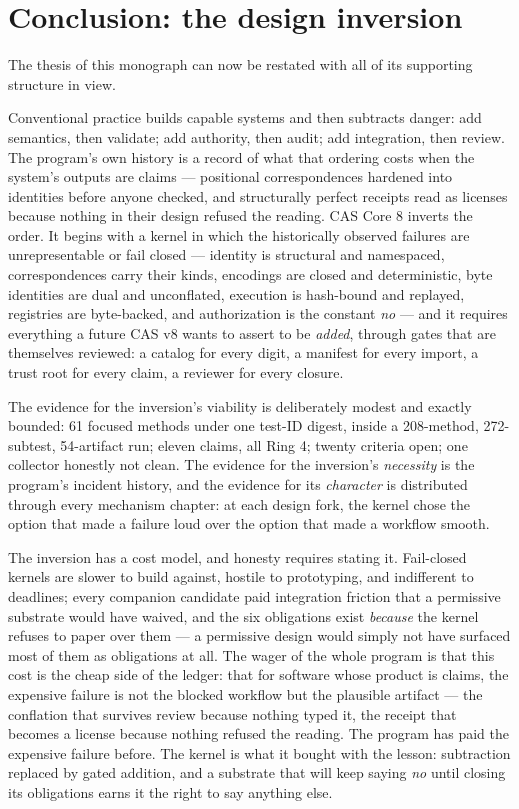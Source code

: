 \section{Conclusion: the design inversion}\label{evid:conclusion}

The thesis of this monograph can now be restated with all of its supporting structure in view.

Conventional practice builds capable systems and then subtracts danger: add semantics, then validate; add authority, then audit; add integration, then review. The program's own history is a record of what that ordering costs when the system's outputs are claims --- positional correspondences hardened into identities before anyone checked, and structurally perfect receipts read as licenses because nothing in their design refused the reading. CAS Core 8 inverts the order. It begins with a kernel in which the historically observed failures are unrepresentable or fail closed --- identity is structural and namespaced, correspondences carry their kinds, encodings are closed and deterministic, byte identities are dual and unconflated, execution is hash-bound and replayed, registries are byte-backed, and authorization is the constant \emph{no} --- and it requires everything a future CAS v8 wants to assert to be \emph{added}, through gates that are themselves reviewed: a catalog for every digit, a manifest for every import, a trust root for every claim, a reviewer for every closure.

The evidence for the inversion's viability is deliberately modest and exactly bounded: 61 focused methods under one test-ID digest, inside a 208-method, 272-subtest, 54-artifact run; eleven claims, all Ring 4; twenty criteria open; one collector honestly not clean. The evidence for the inversion's \emph{necessity} is the program's incident history, and the evidence for its \emph{character} is distributed through every mechanism chapter: at each design fork, the kernel chose the option that made a failure loud over the option that made a workflow smooth.

The inversion has a cost model, and honesty requires stating it. Fail-closed kernels are slower to build against, hostile to prototyping, and indifferent to deadlines; every companion candidate paid integration friction that a permissive substrate would have waived, and the six obligations exist \emph{because} the kernel refuses to paper over them --- a permissive design would simply not have surfaced most of them as obligations at all. The wager of the whole program is that this cost is the cheap side of the ledger: that for software whose product is claims, the expensive failure is not the blocked workflow but the plausible artifact --- the conflation that survives review because nothing typed it, the receipt that becomes a license because nothing refused the reading. The program has paid the expensive failure before. The kernel is what it bought with the lesson: subtraction replaced by gated addition, and a substrate that will keep saying \emph{no} until closing its obligations earns it the right to say anything else.

